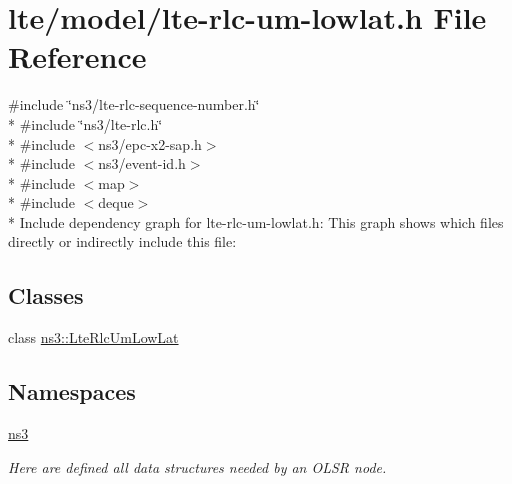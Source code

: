 \hypertarget{lte-rlc-um-lowlat_8h}{}\section{lte/model/lte-\/rlc-\/um-\/lowlat.h File Reference}
\label{lte-rlc-um-lowlat_8h}
{\ttfamily \#include \char`\"{}ns3/lte-\/rlc-\/sequence-\/number.\+h\char`\"{}}\\*
{\ttfamily \#include \char`\"{}ns3/lte-\/rlc.\+h\char`\"{}}\\*
{\ttfamily \#include $<$ns3/epc-\/x2-\/sap.\+h$>$}\\*
{\ttfamily \#include $<$ns3/event-\/id.\+h$>$}\\*
{\ttfamily \#include $<$map$>$}\\*
{\ttfamily \#include $<$deque$>$}\\*
Include dependency graph for lte-\/rlc-\/um-\/lowlat.h\+:
This graph shows which files directly or indirectly include this file\+:
\subsection*{Classes}
\begin{DoxyCompactItemize}
\item 
class \hyperlink{classns3_1_1LteRlcUmLowLat}{ns3\+::\+Lte\+Rlc\+Um\+Low\+Lat}
\end{DoxyCompactItemize}
\subsection*{Namespaces}
\begin{DoxyCompactItemize}
\item 
 \hyperlink{namespacens3}{ns3}
\begin{DoxyCompactList}\small\item\em Here are defined all data structures needed by an O\+L\+SR node. \end{DoxyCompactList}\end{DoxyCompactItemize}
